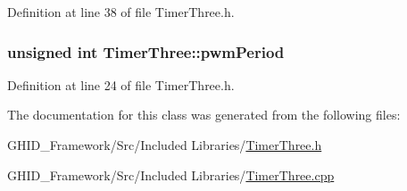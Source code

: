 \-Definition at line 38 of file \-Timer\-Three.\-h.

\hypertarget{class_timer_three_ad0b8c2a4aeb60ee88ee07c444946d70c}{
\subsubsection[{pwm\-Period}]{\setlength{\rightskip}{0pt plus 5cm}unsigned int {\bf \-Timer\-Three\-::pwm\-Period}}}\label{class_timer_three_ad0b8c2a4aeb60ee88ee07c444946d70c}


\-Definition at line 24 of file \-Timer\-Three.\-h.



\-The documentation for this class was generated from the following files\-:\begin{DoxyCompactItemize}
\item 
\-G\-H\-I\-D\-\_\-\-Framework/\-Src/\-Included Libraries/\hyperlink{_timer_three_8h}{\-Timer\-Three.\-h}\item 
\-G\-H\-I\-D\-\_\-\-Framework/\-Src/\-Included Libraries/\hyperlink{_timer_three_8cpp}{\-Timer\-Three.\-cpp}\end{DoxyCompactItemize}
